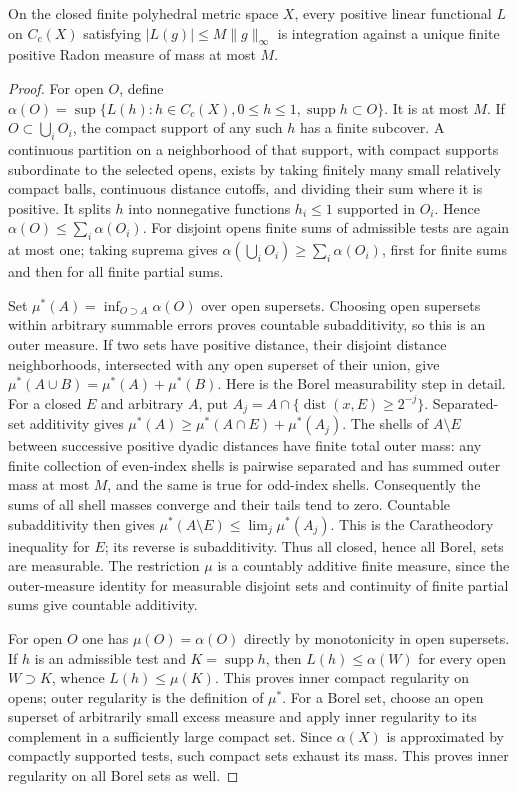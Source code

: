 \begin{lemma}\label{radon-lemma}
On the closed finite polyhedral metric space $X$, every positive linear
functional $L$ on $C_c(X)$ satisfying $|L(g)|\leq M\|g\|_\infty$ is
integration against a unique finite positive Radon measure of mass at
most $M$.
\end{lemma}
\begin{proof}
For open $O$, define
$\alpha(O)=\sup\{L(h):h\in C_c(X),0\leq h\leq1,
\operatorname{supp}h\subset O\}$.
It is at most $M$. If $O\subset\bigcup_iO_i$, the compact support of
any such $h$ has a finite subcover. A continuous partition on a neighborhood
of that support, with compact supports subordinate to the selected opens,
exists by taking finitely many small relatively compact balls, continuous
distance cutoffs, and dividing their sum where it is positive. It splits
$h$ into nonnegative functions $h_i\leq1$ supported in $O_i$.
Hence $\alpha(O)\leq\sum_i\alpha(O_i)$. For disjoint opens finite
sums of admissible tests are again at most one; taking suprema gives
$\alpha(\bigcup_iO_i)\geq\sum_i\alpha(O_i)$, first for finite sums
and then for all finite partial sums.

Set $\mu^*(A)=\inf_{O\supset A}\alpha(O)$ over open supersets.
Choosing open supersets within arbitrary summable errors proves countable
subadditivity, so this is an outer measure. If two sets have positive
distance, their disjoint distance neighborhoods, intersected with any
open superset of their union, give
$\mu^*(A\cup B)=\mu^*(A)+\mu^*(B)$.
Here is the Borel measurability step in detail. For a closed $E$ and
arbitrary $A$, put $A_j=A\cap\{\operatorname{dist}(x,E)\geq2^{-j}\}$.
Separated-set additivity gives
$\mu^*(A)\geq\mu^*(A\cap E)+\mu^*(A_j)$.
The shells of $A\setminus E$ between successive positive dyadic distances
have finite total outer mass: any finite collection of even-index shells
is pairwise separated and has summed outer mass at most $M$, and the
same is true for odd-index shells. Consequently the sums of all shell
masses converge and their tails tend to zero. Countable subadditivity
then gives
$\mu^*(A\setminus E)\leq\lim_j\mu^*(A_j)$.
This is the Caratheodory inequality for $E$; its reverse is subadditivity.
Thus all closed, hence all Borel, sets are measurable. The restriction
$\mu$ is a countably additive finite measure, since the outer-measure
identity for measurable disjoint sets and continuity of finite partial
sums give countable additivity.

For open $O$ one has $\mu(O)=\alpha(O)$ directly by monotonicity in
open supersets. If $h$ is an admissible test and $K=\operatorname{supp}h$,
then $L(h)\leq\alpha(W)$ for every open $W\supset K$, whence
$L(h)\leq\mu(K)$. This proves inner compact regularity on opens;
outer regularity is the definition of $\mu^*$. For a Borel set, choose
an open superset of arbitrarily small excess measure and apply inner
regularity to its complement in a sufficiently large compact set.
Since $\alpha(X)$ is approximated by compactly supported tests, such
compact sets exhaust its mass. This proves inner regularity on all
Borel sets as well.


\end{proof}

